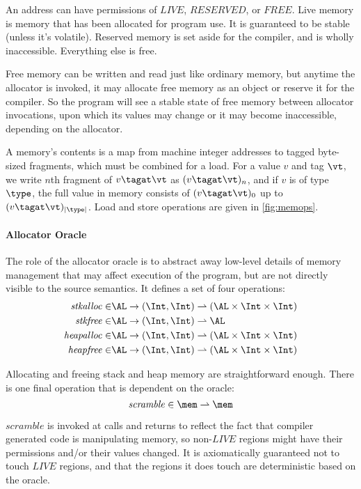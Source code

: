 \documentclass{article}
\begin{document}
An address can have permissions of \(\mathit{LIVE}\), \(\mathit{RESERVED}\), or \(\mathit{FREE}\).
Live memory is memory that has been allocated for program use. It is guaranteed to be
stable (unless it's volatile). Reserved memory is set aside for the compiler,
and is wholly inaccessible. Everything else is free.

Free memory can be written and read just like ordinary memory, but anytime the
allocator is invoked, it may allocate free memory as an object or reserve it for
the compiler. So the program will see a stable state of free memory
between allocator invocations, upon which its values may change or it
may become inaccessible, depending on the allocator.

A memory's contents is a map from machine integer addresses to tagged
byte-sized fragments, which must be combined for a load.
For a value \(v\) and tag \(\vt\), we write \(n\)th fragment of \(v\tagat\vt\)
as \((v\tagat\vt)_n\), and if \(v\) is of type \(\type\), the full value in memory
consists of \((v\tagat\vt)_0\) up to \((v\tagat\vt)_{|\type|}\).
Load and store operations are given in \cref{fig:memops}.

\paragraph{Allocator Oracle}

The role of the allocator oracle is to abstract away low-level details of memory
management that may affect execution of the program, but are not directly visible
to the source semantics. It defines a set of four operations:
\begin{align*}
  \mathit{stkalloc} \in & \AL \rightarrow (\Int, \Int) \rightharpoonup (\AL \times \Int \times \Int) \\
  \mathit{stkfree} \in & \AL \rightarrow (\Int, \Int) \rightharpoonup \AL \\
  \mathit{heapalloc} \in & \AL \rightarrow (\Int, \Int) \rightharpoonup (\AL \times \Int \times \Int) \\
  \mathit{heapfree} \in & \AL \rightarrow (\Int, \Int) \rightharpoonup (\AL \times \Int \times \Int) \\
\end{align*}

Allocating and freeing stack and heap memory are straightforward enough.
There is one final operation that is dependent on the oracle:
\[\mathit{scramble} \in \mem \rightharpoonup \mem\]

\(\mathit{scramble}\) is invoked at calls and returns to reflect the fact that compiler generated
code is manipulating memory, so non-\(\mathit{LIVE}\) regions might have their permissions
and/or their values changed. It is axiomatically guaranteed not to touch \(\mathit{LIVE}\)
regions, and that the regions it does touch are deterministic based on the oracle.
\end{document}
